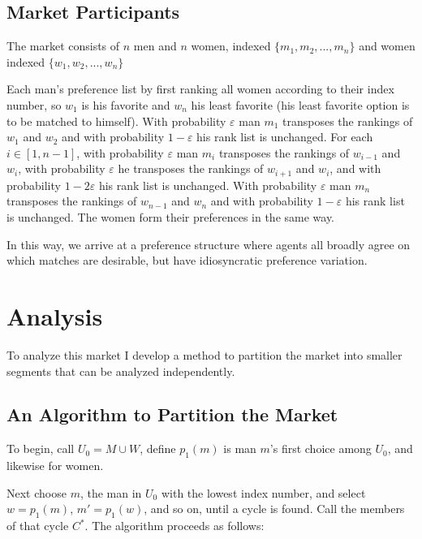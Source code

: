 \documentclass[WP]{AEA}
\begin{document}
\subsection{Market Participants}

The market consists of $n$ men and $n$ women,  indexed $\{ m_1, m_2, ... ,m_n\}$ and women indexed $\{ w_1, w_2, ... ,w_n\}$
	
Each man's preference list by first ranking all women according to their index number, so $w_1$ is his favorite and $w_n$ his least favorite (his least favorite option is to be matched to himself).  
With probability $\varepsilon$ man $m_1$ transposes the rankings of $w_{1}$ and $w_2$ and with probability $1-\varepsilon$ his rank list is unchanged.  For each $i  \in [1, n-1]$, with probability $\varepsilon$ man $m_i$ transposes the rankings of $w_{i-1}$ and $w_i$, with probability $\varepsilon$ he transposes the rankings of $w_{i+1}$ and $w_i$, and with probability $1-2\varepsilon$ his rank list is unchanged. With probability $\varepsilon$ man $m_n$ transposes the rankings of $w_{n-1}$ and $w_n$ and with probability $1-\varepsilon$ his rank list is unchanged.
The women form their preferences in the same way.

In this way, we arrive at a preference structure where agents all broadly agree on which matches are desirable, but have idiosyncratic preference variation.
	


	
\section{Analysis}

To analyze this market I develop a method to partition the market into smaller segments that can be analyzed independently.


\subsection{An Algorithm to Partition the Market} \label{subsect:partition}

To begin, call $U_0 = M \cup W$, define $p_1(m)$ is man $m$'s first choice among $U_0$, and likewise for women.

Next choose $m$, the man in $U_0$ with the lowest index number, and select $w = p_1(m)$, $m' = p_1(w)$, and so on, until a cycle is found. Call the members of that cycle $C^*$.  The algorithm proceeds as follows: 
\end{document}
